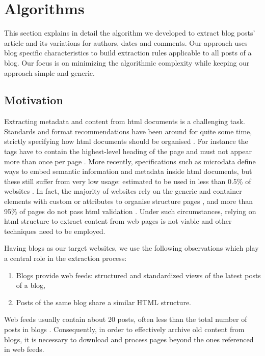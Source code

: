 \section{Algorithms}
\label{algorithms}

This section explains in detail the algorithm we developed to extract blog posts' article and its variations for authors, dates and comments. Our approach uses blog specific characteristics to build extraction rules applicable to all posts of a blog. Our focus is on minimizing the algorithmic complexity while keeping our approach simple and generic.


\subsection{Motivation}
\label{motivation}

Extracting metadata and content from html documents is a challenging task. Standards and format recommendations have been around for quite some time, strictly specifying how html documents should be organised \cite{w3c2013}. For instance the  tags have to contain the highest-level heading of the page and must not appear more than once per page \cite{w3c2002}. More recently, specifications such as microdata \cite{whatwg2013} define ways to embed semantic information and metadata inside html documents, but these still suffer from very low usage: estimated to be used in less than 0.5\% of websites \cite{andrewrogers2013}. In fact, the majority of websites rely on the generic  and  container elements with custom  or  attributes to organise structure pages \cite{brianwilson2008}, and more than 95\% of pages do not pass html validation \cite{brianwilson2008-a}. Under such circumstances, relying on html structure to extract content from web pages is not viable and other techniques need to be employed.


Having blogs as our target websites, we use the following observations which play a central role in the extraction process:
\begin{enumerate}[label={(\arabic*)}]
  \item\label{havefeedAssum} Blogs provide web feeds: structured and standardized views of the latest posts of a blog,
  \item\label{similarhtmlAssum} Posts of the same blog share a similar HTML structure.
\end{enumerate}
Web feeds usually contain about 20 posts, often less than the total number of posts in blogs \cite{oita2010}. Consequently, in order to effectively archive old content from blogs, it is necessary to download and process pages beyond the ones referenced in web feeds.


